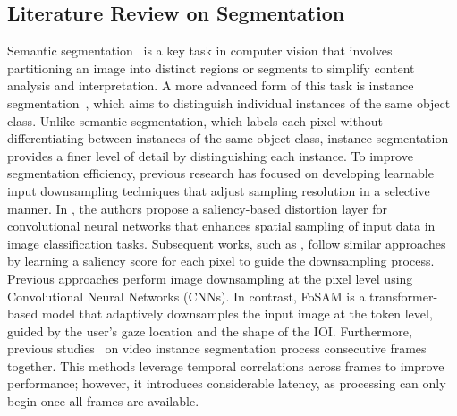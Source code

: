 \documentclass{article}
\begin{document}
\subsection{Literature Review on Segmentation}
\label{sec:bg:segmentation}  
Semantic segmentation~\cite{Shelhamer2014FullyCN, Badrinarayanan2015SegNetAD, chen2017deeplab, Touvron2020TrainingDI, Cheng2021PerPixelCI, Minaee2020ImageSU, Li2023TransformerBasedVS, Xiong2019UPSNetAU, Cheng2019PanopticDeepLabAS} is a key task in computer vision that involves partitioning an image into distinct regions or segments to simplify content analysis and interpretation. A more advanced form of this task is instance segmentation~\cite{He2017MaskR, Li2020FullyCN, Neven2019InstanceSB, Brabandere2017SemanticIS}, which aims to distinguish individual instances of the same object class. Unlike semantic segmentation, which labels each pixel without differentiating between instances of the same object class, instance segmentation provides a finer level of detail by distinguishing each instance.
To improve segmentation efficiency, previous research has focused on developing learnable input downsampling techniques that adjust sampling resolution in a selective manner. In \cite{recasens2018learning}, the authors propose a saliency-based distortion layer for convolutional neural networks that enhances spatial sampling of input data in image classification tasks. Subsequent works, such as \cite{jin2021learning, thavamani2021fovea, marin2019efficient,zeng2025foveated}, follow similar approaches by learning a saliency score for each pixel to guide the downsampling process.
Previous approaches perform image downsampling at the pixel level using Convolutional Neural Networks (CNNs). In contrast, FoSAM is a transformer-based model that adaptively downsamples the input image at the token level, guided by the user's gaze location and the shape of the IOI.
Furthermore, previous studies~\cite{yang2019video, wang2021end, yan2023universal, rajivc2023segment, lin2021video, wu2022seqformer} on video instance segmentation process consecutive frames together.
This methods leverage temporal correlations across frames to improve performance; however, it introduces considerable latency, as processing can only begin once all frames are available.
\end{document}
